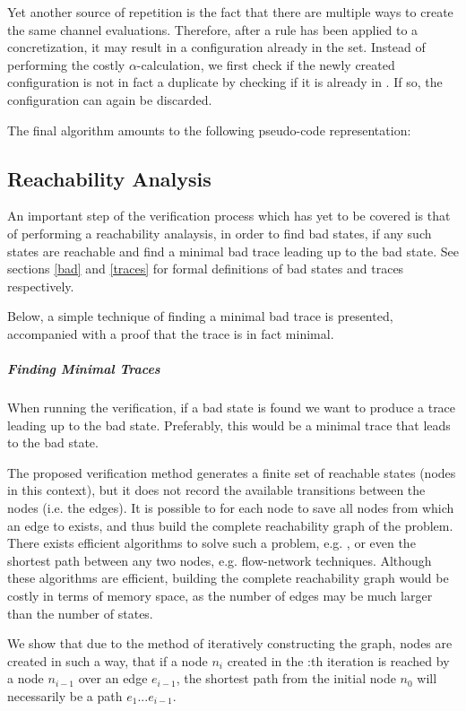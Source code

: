 Yet another source of repetition is the fact that there are multiple ways to create the same channel evaluations. Therefore, after a rule has been applied to a concretization, it may result in a configuration already in the set. Instead of performing the costly $\alpha$-calculation, we first check if the newly created configuration is not in fact a duplicate by checking if it is already in . If so, the configuration can again be discarded.

The final algorithm amounts to the following pseudo-code representation:

\subsection{Reachability Analysis}
An important step of the verification process which has yet to be covered is that of performing a reachability analaysis, in order to find bad states, if any such states are reachable and find a minimal bad trace leading up to the bad state. See sections \ref{bad} and \ref{traces} for formal definitions of bad states and traces respectively.

Below, a simple technique of finding a minimal bad trace is presented, accompanied with a proof that the trace is in fact minimal.

\subparagraph{Finding Minimal Traces}
When running the verification, if a bad state is found we want to produce a trace leading up to the bad state. Preferably, this would be a minimal trace that leads to the bad state.
 
The proposed verification method generates a finite set of reachable states (nodes in this context), but it does not record the available transitions between the nodes (i.e. the edges). It is possible to for each node  to save all nodes  from which an edge to  exists, and thus build the complete reachability graph of the problem. There exists efficient algorithms to solve such a problem, e.g. , or even the shortest path between any two nodes, e.g. flow-network techniques. Although these algorithms are efficient, building the complete reachability graph would be costly in terms of memory space, as the number of edges may be much larger than the number of states.

 
We show that due to the method of iteratively constructing the graph, nodes are created in such a way, that if a node $n_{i}$ created in the :th iteration is reached by a node $n_{i-1}$ over an edge $e_{i-1}$, the shortest path from the initial node $n_0$ will necessarily be a path $e_1...e_{i-1}$.
 
